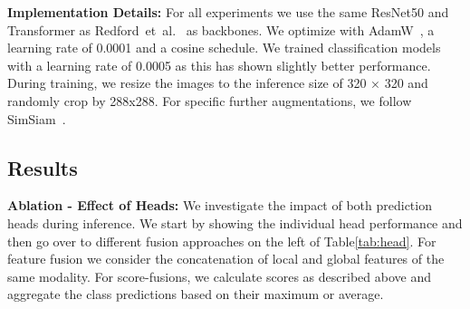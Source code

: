 \documentclass[runningheads]{llncs}
\begin{document}
\noindent\textbf{Implementation Details: } For all experiments we use the same ResNet50 and Transformer as Redford~et~al.~\cite{radford2021learning} as backbones. We optimize with AdamW~\cite{loshchilov2017decoupled}, a learning rate of 0.0001 and a cosine schedule. We trained classification models with a learning rate of 0.0005 as this has shown slightly better performance. During training, we resize the images to the inference size of 320 × 320 and randomly crop by 288x288. For specific further augmentations, we follow SimSiam~\cite{chen2021exploring}.


\subsection{Results}
\noindent\textbf{Ablation - Effect of Heads:}
We investigate the impact of both prediction heads during inference. We start by showing the individual head performance and then go over to different fusion approaches on the left of Table\ref{tab:head}. For feature fusion we consider the concatenation of local and global features of the same modality. For score-fusions, we calculate scores as described above and aggregate the class predictions based on their maximum or average.
\end{document}
